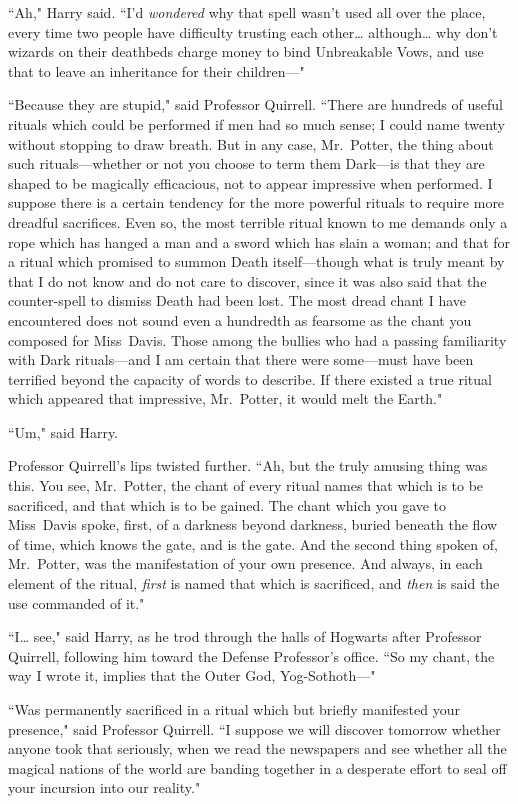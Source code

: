 ``Ah," Harry said. ``I'd \emph{wondered} why that spell wasn't used all over the place, every time two people have difficulty trusting each other{\ldots} although{\ldots} why don't wizards on their deathbeds charge money to bind Unbreakable Vows, and use that to leave an inheritance for their children—"

``Because they are stupid," said Professor Quirrell. ``There are hundreds of useful rituals which could be performed if men had so much sense; I could name twenty without stopping to draw breath. But in any case, Mr.~Potter, the thing about such rituals—whether or not you choose to term them Dark—is that they are shaped to be magically efficacious, not to appear impressive when performed. I suppose there is a certain tendency for the more powerful rituals to require more dreadful sacrifices. Even so, the most terrible ritual known to me demands only a rope which has hanged a man and a sword which has slain a woman; and that for a ritual which promised to summon Death itself—though what is truly meant by that I do not know and do not care to discover, since it was also said that the counter-spell to dismiss Death had been lost. The most dread chant I have encountered does not sound even a hundredth as fearsome as the chant you composed for Miss~Davis. Those among the bullies who had a passing familiarity with Dark rituals—and I am certain that there were some—must have been terrified beyond the capacity of words to describe. If there existed a true ritual which appeared that impressive, Mr.~Potter, it would melt the Earth."

``Um," said Harry.

Professor Quirrell's lips twisted further. ``Ah, but the truly amusing thing was this. You see, Mr.~Potter, the chant of every ritual names that which is to be sacrificed, and that which is to be gained. The chant which you gave to Miss~Davis spoke, first, of a darkness beyond darkness, buried beneath the flow of time, which knows the gate, and is the gate. And the second thing spoken of, Mr.~Potter, was the manifestation of your own presence. And always, in each element of the ritual, \emph{first} is named that which is sacrificed, and \emph{then} is said the use commanded of it."

``I{\ldots} see," said Harry, as he trod through the halls of Hogwarts after Professor Quirrell, following him toward the Defense Professor's office. ``So my chant, the way I wrote it, implies that the Outer God, Yog-Sothoth—"

``Was permanently sacrificed in a ritual which but briefly manifested your presence," said Professor Quirrell. ``I suppose we will discover tomorrow whether anyone took that seriously, when we read the newspapers and see whether all the magical nations of the world are banding together in a desperate effort to seal off your incursion into our reality."

